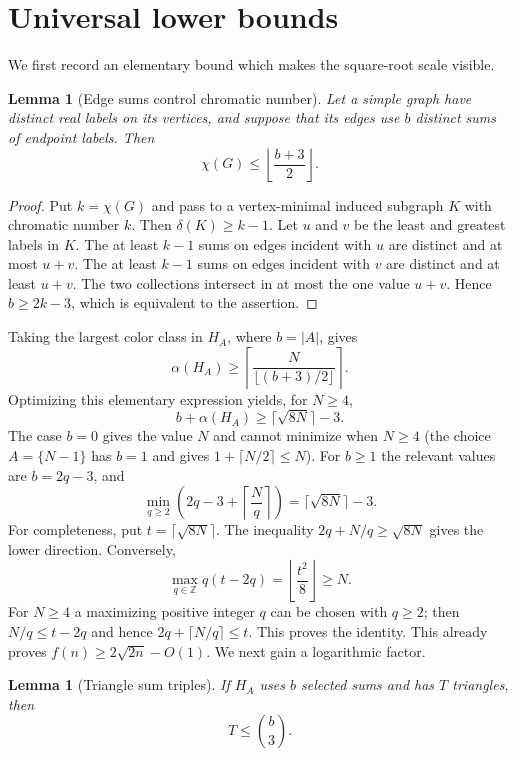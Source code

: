 \documentclass[11pt]{article}
\numberwithin{equation}{section}
\newtheorem{lemma}[theorem]{Lemma}
\theoremstyle{definition}
\theoremstyle{remark}
\begin{document}
\section{Universal lower bounds}\label{sec:lower}

We first record an elementary bound which makes the square-root scale
visible.

\begin{lemma}[Edge sums control chromatic number]\label{lem:chromatic}
Let a simple graph have distinct real labels on its vertices, and suppose
that its edges use $b$ distinct sums of endpoint labels.  Then
\[
 \chi(G)\le \left\lfloor\frac{b+3}{2}\right\rfloor.
\]
\end{lemma}

\begin{proof}
Put $k=\chi(G)$ and pass to a vertex-minimal induced subgraph $K$ with
chromatic number $k$.  Then $\delta(K)\ge k-1$.  Let $u$ and $v$ be the
least and greatest labels in $K$.  The at least $k-1$ sums on edges
incident with $u$ are distinct and at most $u+v$.  The at least $k-1$
sums on edges incident with $v$ are distinct and at least $u+v$.  The
two collections intersect in at most the one value $u+v$.  Hence
$b\ge2k-3$, which is equivalent to the assertion.
\end{proof}

Taking the largest color class in $H_A$, where $b=|A|$, gives
\[
 \alpha(H_A)\ge
 \left\lceil\frac{N}{\lfloor(b+3)/2\rfloor}\right\rceil.
\]
Optimizing this elementary expression yields, for $N\ge4$,
\[
 b+\alpha(H_A)\ge \lceil\sqrt{8N}\rceil-3.
\]
The case $b=0$ gives the value $N$ and cannot minimize when $N\ge4$
(the choice $A=\{N-1\}$ has $b=1$ and gives
$1+\lceil N/2\rceil\le N$).  For $b\ge1$ the
relevant values are $b=2q-3$, and
\[
 \min_{q\ge2}\left(2q-3+\left\lceil\frac Nq\right\rceil\right)
 =\lceil\sqrt{8N}\rceil-3.
\]
For completeness, put $t=\lceil\sqrt{8N}\rceil$.  The inequality
$2q+N/q\ge\sqrt{8N}$ gives the lower direction.  Conversely,
\[
 \max_{q\in\mathbb Z}q(t-2q)=\left\lfloor\frac{t^2}{8}\right\rfloor
 \ge N.
\]
For $N\ge4$ a maximizing positive integer $q$ can be chosen with $q\ge2$;
then $N/q\le t-2q$ and hence
$2q+\lceil N/q\rceil\le t$.  This proves the identity.
This already proves $f(n)\ge2\sqrt{2n}-O(1)$.  We next gain a logarithmic
factor.

\begin{lemma}[Triangle sum triples]\label{lem:triangles}
If $H_A$ uses $b$ selected sums and has $T$ triangles, then
\[
 T\le\binom b3.
\]
\end{lemma}
\end{document}
